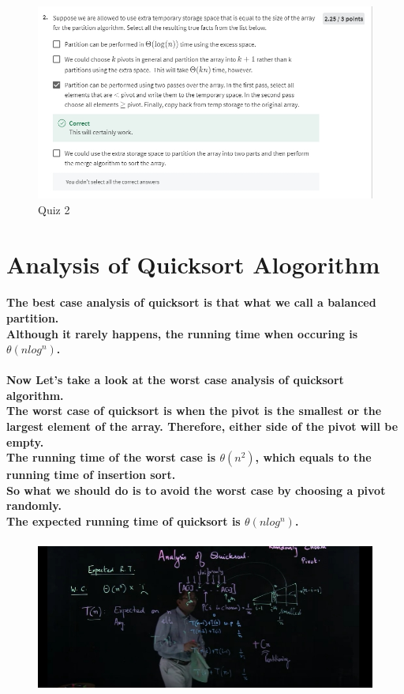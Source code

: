 \documentclass{article}
\begin{document}
\begin{figure}[H]
    \includegraphics[width=\textwidth]{week3lomutoquiz2.png}
    \caption{Quiz 2\\}
\end{figure}

\section{Analysis of Quicksort Alogorithm}

\paragraph{The best case analysis of quicksort is that what we call a balanced partition.\\
Although it rarely happens, the running time when occuring is $\theta(nlog^n)$.}

\paragraph{Now Let's take a look at the worst case analysis of quicksort algorithm.\\
The worst case of quicksort is when the pivot is the smallest or the largest element of 
the array. Therefore, either side of the pivot will be empty.\\
The running time of the worst case is $\theta(n^2)$, which equals to the running time of insertion sort.\\
So what we should do is to avoid the worst case by choosing a pivot randomly.\\
The expected running time of quicksort is $\theta(nlog^n)$.\\}

\begin{figure}[H]
    \includegraphics[width=\textwidth]{expectedaveragerunningtime.png}
\end{figure}
\end{document}
